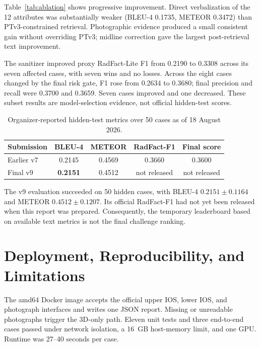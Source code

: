 \documentclass[runningheads]{llncs}
\begin{document}
Table~\ref{tab:ablation} shows progressive improvement. Direct verbalization of the 12 attributes was substantially weaker (BLEU-4 0.1735, METEOR 0.3472) than PTv3-constrained retrieval. Photographic evidence produced a small consistent gain without overriding PTv3; midline correction gave the largest post-retrieval text improvement.

The sanitizer improved proxy RadFact-Lite F1 from 0.2190 to 0.3308 across its seven affected cases, with seven wins and no losses. Across the eight cases changed by the final risk gate, F1 rose from 0.2634 to 0.3680; final precision and recall were 0.3700 and 0.3659. Seven cases improved and one decreased. These subset results are model-selection evidence, not official hidden-test scores.

\begin{table}[t]
\centering
\caption{Organizer-reported hidden-test metrics over 50 cases as of 18 August 2026.}
\label{tab:hidden}
\small
\begin{tabular}{lcccc}
\toprule
Submission & BLEU-4 & METEOR & RadFact-F1 & Final score \\
\midrule
Earlier v7 & 0.2145 & 0.4569 & 0.3660 & 0.3600 \\
Final v9 & \textbf{0.2151} & 0.4512 & not released & not released \\
\bottomrule
\end{tabular}
\end{table}

The v9 evaluation succeeded on 50 hidden cases, with BLEU-4 $0.2151\pm0.1164$ and METEOR $0.4512\pm0.1207$. Its official RadFact-F1 had not yet been released when this report was prepared. Consequently, the temporary leaderboard based on available text metrics is not the final challenge ranking.

\section{Deployment, Reproducibility, and Limitations}

The amd64 Docker image accepts the official upper IOS, lower IOS, and photograph interfaces and writes one JSON report. Missing or unreadable photographs trigger the 3D-only path. Eleven unit tests and three end-to-end cases passed under network isolation, a 16~GB host-memory limit, and one GPU. Runtime was 27--40 seconds per case.
\end{document}
